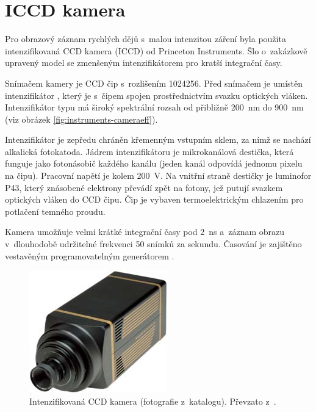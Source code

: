 \section{ICCD kamera }
\label{sec:instruments-iccd}
Pro obrazový záznam rychlých dějů s~malou intenzitou záření byla použita
intenzifikovaná CCD kamera (ICCD) od Princeton Instruments.
Šlo o~zakázkově upravený model 
se zmenšeným intenzifikátorem pro kratší integrační časy.

Snímačem kamery je CCD čip s~rozlišením \num{1024}\times\SI{256}{\pixel}.
Před snímačem je umístěn intenzifikátor ,
který je s~čipem spojen prostřednictvím svazku optických vláken.
Intenzifikátor typu  má široký spektrální rozsah
od přibližně \SI{200}{\nano\metre} do \SI{900}{\nano\metre}
(viz obrázek \ref{fig:instruments-cameraeff}).

Intenzifikátor je zepředu chráněn křemenným vstupním sklem,
za nímž se nachází alkalická fotokatoda.
Jádrem intenzifikátoru je mikrokanálová destička,
která funguje jako fotonásobič každého kanálu
(jeden kanál odpovídá jednomu pixelu na čipu).
Pracovní napětí je kolem \SI{200}{\volt}.
Na vnitřní straně destičky je luminofor P43,
který znásobené elektrony převádí zpět na fotony,
jež putují svazkem optických vláken do CCD čipu.
\autocite{pi-iccd}
Čip je vybaven termoelektrickým chlazením pro potlačení temného proudu.
\autocite{pimax-datasheet}

Kamera umožňuje velmi krátké integrační časy pod \SI{2}{\nano\second}
a~záznam obrazu v~dlouhodobě udržitelné frekvenci 50 snímků za sekundu.
Časování je zajištěno vestavěným programovatelným generátorem .
\autocite{pimax-datasheet}

\begin{figure}[htp]
	\centering
	\includegraphics[scale=0.4]{img/pimax-1024}
	\caption{Intenzifikovaná CCD kamera 
		(fotografie z~katalogu).
		Převzato z~\cite{pimax-datasheet}.}
	\label{fig:instruments-camera}
\end{figure}


